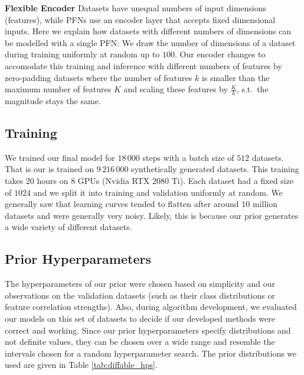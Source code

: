 \documentclass{article}
\begin{document}
\textbf{Flexible Encoder}
Datasets have unequal numbers of input dimensions (features), while PFNs use an encoder layer that accepts fixed dimensional inputs. Here we explain how datasets with different numbers of dimensions can be modelled with a single PFN:
We draw the number of dimensions of a dataset during training uniformly at random up to $100$.
Our encoder changes to accomodate this training and inference with different numbers of features by zero-padding datasets where
the number of features $k$ is smaller than the maximum number of features $K$ and scaling these features by $\frac{K}{k}$, s.t.\ the magnitude stays the same.

\subsection{\methodname{} Training}\label{app:training_details}
We trained our final model for $18\,000$ steps with a batch size of $512$ datasets. That is our \methodname{} is trained on $9\,216\,000$ synthetically generated datasets. This training takes 20 hours on 8 GPUs (Nvidia RTX 2080 Ti). Each dataset had a fixed size of $1024$ and we split it into training and validation uniformly at random. We generally saw that learning curves tended to flatten after around $10$ million datasets and were generally very noisy. Likely, this is because our prior generates a wide variety of different datasets.

\subsection{Prior Hyperparameters}
\label{app:prior_hparams}
The hyperparameters of our prior were chosen based on simplicity and our observations on the validation datasets (such as their class distributions or feature correlation strengths). Also, during algorithm development, we evaluated our models on this set of datasets to decide if our developed methods were correct and working. Since our prior hyperparameters specify distributions and not definite values, they can be chosen over a wide range and resemble the intervals chosen for a random hyperparameter search. The prior distributions we used are given in Table \ref{tab:diffable_hps}. %
\end{document}
